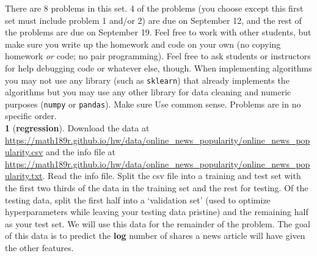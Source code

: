 \documentclass[12pt,letterpaper,fleqn]{hmcpset}
\begin{document}
There are 8 problems in this set. 4 of the problems (you choose except this first
set must include problem 1 and/or 2) are due on September 12,
and the rest of the problems are due on September 19. Feel
free to work with other students, but make sure you write up the homework
and code on your own (no copying homework \textit{or} code; no pair programming).
Feel free to ask students or instructors for help debugging code or whatever else,
though.
When implementing algorithms you may not use any library (such as \texttt{sklearn})
that already implements the algorithms but you may use any other library for
data cleaning and numeric purposes (\texttt{numpy} or \texttt{pandas}). Make sure
Use common
sense.
Problems are in no specific order.\\[1em]


\textbf{1} (\textbf{regression}). Download the data at 
\url{https://math189r.github.io/hw/data/online_news_popularity/online_news_popularity.csv}
and the info file at
\url{https://math189r.github.io/hw/data/online_news_popularity/online_news_popularity.txt}.
Read the info file. Split the csv file into a training and test set with
the first two thirds of the data in the training set and the rest for testing.
Of the testing data, split the first half into a `validation set' (used
to optimize hyperparameters while leaving your testing data pristine) and
the remaining half as your test set.
We will use this data for the remainder of the problem. The goal of this data
is to predict the \textbf{log} number of shares a news article will have given the other
features.
\end{document}
